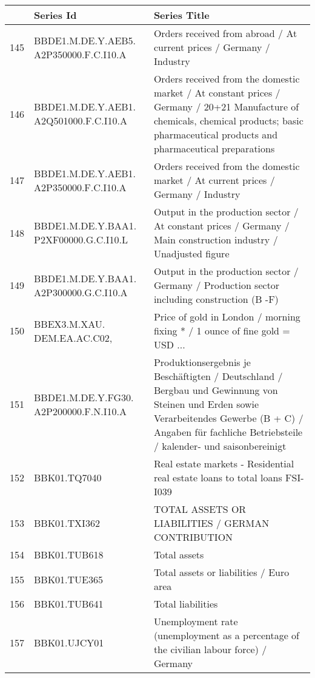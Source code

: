 \documentclass[11pt]{article}
\begin{document}
\begin{table}
\centering
\begin{tabular}{rp{5cm}p{11cm}}
& \textbf{Series Id} & \textbf{Series Title} \\
  \hline
  \hline
  145 & BBDE1.M.DE.Y.AEB5. A2P350000.F.C.I10.A & Orders received from abroad / At current prices / Germany / Industry \\ 
  \hline
  146 & BBDE1.M.DE.Y.AEB1. A2Q501000.F.C.I10.A & Orders received from the domestic market / At constant prices / Germany / 20+21 Manufacture of chemicals, chemical products; basic pharmaceutical products and pharmaceutical preparations \\ 
  \hline
  147 & BBDE1.M.DE.Y.AEB1. A2P350000.F.C.I10.A & Orders received from the domestic market / At current prices / Germany / Industry \\ 
  \hline
  148 & BBDE1.M.DE.Y.BAA1. P2XF00000.G.C.I10.L & Output in the production sector / At constant prices / Germany / Main construction industry / Unadjusted figure \\ 
  \hline
  149 & BBDE1.M.DE.Y.BAA1. A2P300000.G.C.I10.A & Output in the production sector / Germany / Production sector including construction (B -F) \\ 
  \hline
  150 & BBEX3.M.XAU. DEM.EA.AC.C02, & Price of gold in London / morning fixing * / 1 ounce of fine gold = USD ... \\ 
  \hline
  151 & BBDE1.M.DE.Y.FG30. A2P200000.F.N.I10.A & Produktionsergebnis je Beschäftigten / Deutschland / Bergbau und Gewinnung von Steinen und Erden sowie Verarbeitendes Gewerbe (B + C) / Angaben für fachliche Betriebsteile / kalender- und saisonbereinigt \\ 
  \hline
  152 & BBK01.TQ7040 & Real estate markets - Residential real estate loans to total loans                                        FSI-I039 \\ 
  \hline
  153 & BBK01.TXI362 & TOTAL ASSETS OR LIABILITIES / GERMAN CONTRIBUTION \\ 
  \hline
  154 & BBK01.TUB618 & Total assets \\ 
  \hline
  155 & BBK01.TUE365 & Total assets or liabilities / Euro area \\ 
  \hline
  156 & BBK01.TUB641 & Total liabilities \\ 
  \hline
  157 & BBK01.UJCY01 & Unemployment rate (unemployment as a percentage of the civilian labour force) / Germany \\ 
\end{tabular}
\end{table}
\end{document}
